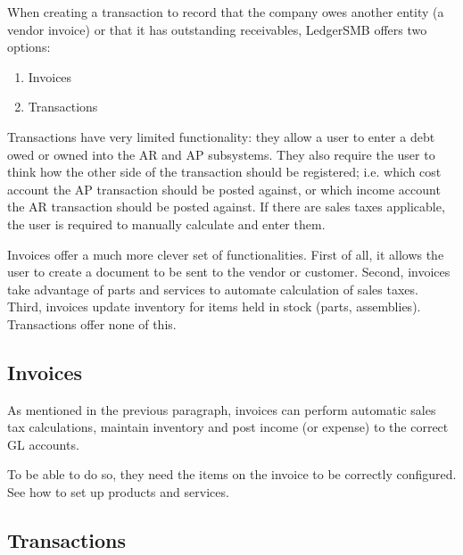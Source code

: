 When creating a transaction to record that the company owes another
entity (a vendor invoice) or that it has outstanding receivables,
LedgerSMB offers two options:

\begin{enumerate}
\item Invoices
\item Transactions
\end{enumerate}

Transactions have very limited functionality: they allow a user to enter
a debt owed or owned into the AR and AP subsystems. They also require the
user to think how the other side of the transaction should be registered;
i.e. which cost account the AP transaction should be posted against, or
which income account the AR transaction should be posted against. If there
are sales taxes applicable, the user is required to manually calculate and
enter them.

Invoices offer a much more clever set of functionalities. First of all, it
allows the user to create a document to be sent to the vendor or \gls{customer}.
Second, invoices take advantage of parts and services
to automate calculation of sales taxes. Third, invoices update inventory
for items held in stock (parts, assemblies). Transactions offer none of this.

\subsection{Invoices}
\label{subsec-business-processes-invoicing-manual-entry-invoices}


As mentioned in the previous paragraph, invoices  can perform automatic
sales tax calculations, maintain inventory and post income (or expense)
to the correct GL accounts.

To be able to do so, they need the items on the invoice to be correctly
configured. See  how to set up products
and services.



\subsection{Transactions}
\label{subsec-business-processes-invoicing-manual-entry-transactions}


